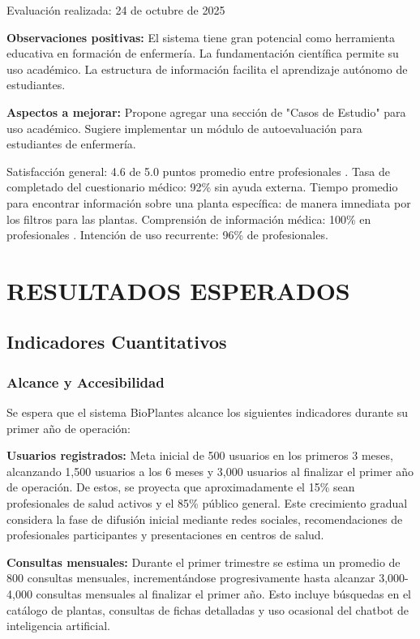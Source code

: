 \documentclass[12pt,a4paper]{article}
\begin{document}
Evaluación realizada: 24 de octubre de 2025

\textbf{Observaciones positivas:} El sistema tiene gran potencial como herramienta educativa en formación de enfermería. La fundamentación científica permite su uso académico. La estructura de información facilita el aprendizaje autónomo de estudiantes.

\textbf{Aspectos a mejorar:} Propone agregar una sección de "Casos de Estudio" para uso académico. Sugiere implementar un módulo de autoevaluación para estudiantes de enfermería.


Satisfacción general: 4.6 de 5.0 puntos promedio entre profesionales . Tasa de completado del cuestionario médico: 92\% sin ayuda externa. Tiempo promedio para encontrar información sobre una planta específica:  de manera imnediata por los filtros para las plantas. Comprensión de información médica: 100\% en profesionales . Intención de uso recurrente: 96\% de profesionales.


\section{RESULTADOS ESPERADOS}

\subsection{Indicadores Cuantitativos}

\subsubsection{Alcance y Accesibilidad}

Se espera que el sistema BioPlantes alcance los siguientes indicadores durante su primer año de operación:

\textbf{Usuarios registrados:} Meta inicial de 500 usuarios en los primeros 3 meses, alcanzando 1,500 usuarios a los 6 meses y 3,000 usuarios al finalizar el primer año de operación. De estos, se proyecta que aproximadamente el 15\% sean profesionales de salud activos y el 85\% público general. Este crecimiento gradual considera la fase de difusión inicial mediante redes sociales, recomendaciones de profesionales participantes y presentaciones en centros de salud.

\textbf{Consultas mensuales:} Durante el primer trimestre se estima un promedio de 800 consultas mensuales, incrementándose progresivamente hasta alcanzar 3,000-4,000 consultas mensuales al finalizar el primer año. Esto incluye búsquedas en el catálogo de plantas, consultas de fichas detalladas y uso ocasional del chatbot de inteligencia artificial.
\end{document}
